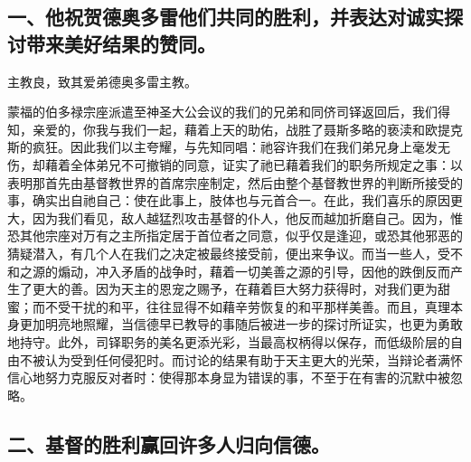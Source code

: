 \subsection{一、他祝贺德奥多雷他们共同的胜利，并表达对诚实探讨带来美好结果的赞同。}

主教良，致其爱弟德奥多雷主教。\par

蒙福的伯多禄宗座派遣至神圣大公会议的我们的兄弟和同侪司铎返回后，我们得知，亲爱的，你我与我们一起，藉着上天的助佑，战胜了聂斯多略的亵渎和欧提克斯的疯狂。因此我们以主夸耀，与先知同唱：祂容许我们在我们弟兄身上毫发无伤，却藉着全体弟兄不可撤销的同意，证实了祂已藉着我们的职务所规定之事：以表明那首先由基督教世界的首席宗座制定，然后由整个基督教世界的判断所接受的事，确实出自祂自己：使在此事上，肢体也与元首合一。在此，我们喜乐的原因更大，因为我们看见，敌人越猛烈攻击基督的仆人，他反而越加折磨自己。因为，惟恐其他宗座对万有之主所指定居于首位者之同意，似乎仅是逢迎，或恐其他邪恶的猜疑潜入，有几个人在我们之决定被最终接受前，便出来争议。而当一些人，受不和之源的煽动，冲入矛盾的战争时，藉着一切美善之源的引导，因他的跌倒反而产生了更大的善。因为天主的恩宠之赐予，在藉着巨大努力获得时，对我们更为甜蜜；而不受干扰的和平，往往显得不如藉辛劳恢复的和平那样美善。而且，真理本身更加明亮地照耀，当信德早已教导的事随后被进一步的探讨所证实，也更为勇敢地持守。此外，司铎职务的美名更添光彩，当最高权柄得以保存，而低级阶层的自由不被认为受到任何侵犯时。而讨论的结果有助于天主更大的光荣，当辩论者满怀信心地努力克服反对者时：使得那本身显为错误的事，不至于在有害的沉默中被忽略。\par


\subsection{二、基督的胜利赢回许多人归向信德。}

